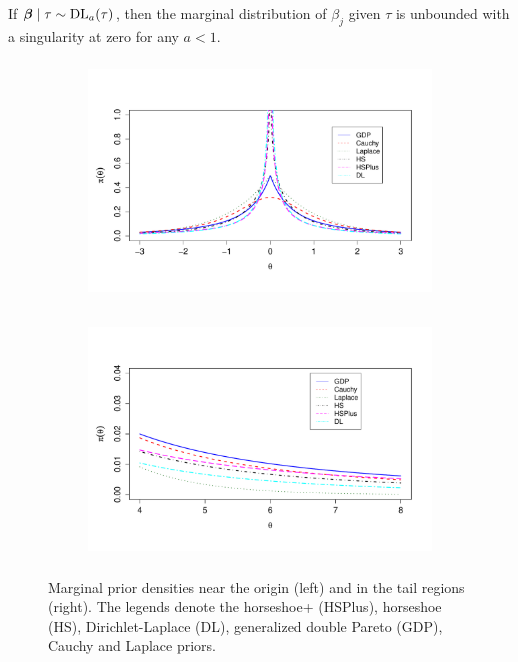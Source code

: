 \documentclass[10pt]{article}
\begin{document}
\begin{proposition}\label{DL_prior_carac}
If $\boldsymbol{\beta} \mid \tau \sim \text{\rm{DL}}_a(\tau)$, then the marginal distribution of $\beta_j$ given $\tau$ is unbounded with a singularity at zero for any $a < 1$.
\end{proposition}

\begin{figure}[ht!]
\centering 
  \begin{subfigure}[t]{0.45\linewidth}
	\includegraphics[height=2.5in,width=\textwidth]{densities_zero_new}%
	\label{fig:zero}
	\end{subfigure}
  \begin{subfigure}[t]{0.45\linewidth}
	\includegraphics[height=2.5in,width=\textwidth]{densities_tails_new}
  \label{fig:tails}
		\end{subfigure}
 \caption{Marginal prior densities near the origin (left) and in the tail regions (right). The legends denote the horseshoe+ (HSPlus), horseshoe (HS), Dirichlet-Laplace (DL), generalized double Pareto (GDP), Cauchy and Laplace priors.}
	\label{fig:priors}
\end{figure}
\end{document}
